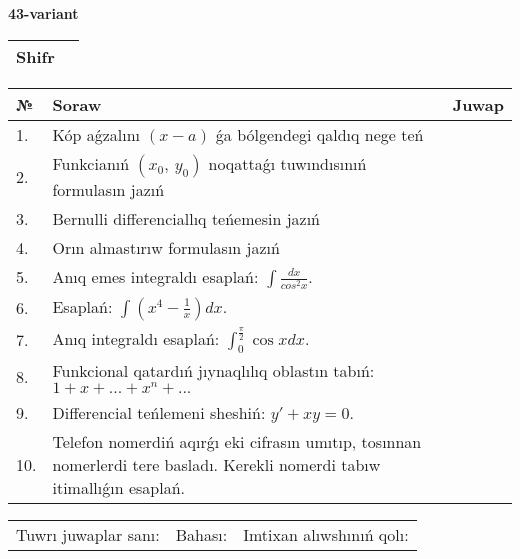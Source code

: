 \documentclass{article}
\begin{document}
  \egroup
  
  \newpage
  
  
  \textbf{43-variant}\\
  
  \bgroup
  \def\arraystretch{1.6} %
  
  \begin{tabular}{|m{5.7cm}|m{9.5cm}|}
  \hline
  Shifr & \\
  \hline
  \end{tabular}
  
  \vspace{1cm}
  
  \begin{tabular}{|m{0.7cm}|m{10cm}|m{4cm}|}
  \hline
  № & Soraw & Juwap \\
  \hline
  1. & Kóp aǵzalını \((x - a)\) ǵa bólgendegi qaldıq nege teń &  \\
  \hline
  2. & Funkcianıń \((x_{0},\ y_{0})\) noqattaǵı tuwındısınıń formulasın jazıń &  \\
  \hline
  3. & Bernulli differenciallıq teńemesin jazıń &  \\
  \hline
  4. & Orın almastırıw formulasın jazıń &  \\
  \hline
  5. & Anıq emes integraldı esaplań: \(\int\frac{dx}{cos^2 x}\). &  \\
  \hline
  6. & Esaplań: \(\int\left( x^{4} - \frac{1}{x} \right)dx\). &  \\
  \hline
  7. & Anıq integraldı esaplań: \(\int_{0}^{\frac{\pi}{2}}{\cos xdx}\). &  \\
  \hline
  8. & Funkcional qatardıń jıynaqlılıq oblastın tabıń:\(1 + x + ... + x^{n} + ...\) &  \\
  \hline
  9. & Differencial teńlemeni sheshiń: \(y' + xy = 0\). &  \\
  \hline
  10. & Telefon nomerdiń aqırǵı eki cifrasın umıtıp, tosınnan nomerlerdi tere basladı. Kerekli nomerdi tabıw itimallıǵın esaplań. &  \\
  \hline
  \end{tabular}
  
  \vspace{1cm}
  
  \begin{tabular}{lll}
  Tuwrı juwaplar sanı: \underline{\hspace{1.5cm}} & 
  Bahası: \underline{\hspace{1.5cm}} & 
  Imtixan alıwshınıń qolı: \underline{\hspace{2cm}} \\
  \end{tabular}
  
\end{document}

